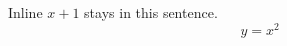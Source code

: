 \documentclass{article}
\begin{document}
Inline $x+1$ stays in this sentence.
\[ y=x^2 \]
\end{document}
